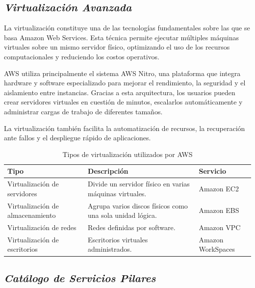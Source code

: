 \documentclass[12pt,a4paper]{article}
\begin{document}
\subsection{{\color{azulnoche}\textbf{\textit{Virtualización Avanzada}}}}

La virtualización constituye una de las tecnologías fundamentales sobre las que se basa Amazon Web Services\parencite{awsNitro}. Esta técnica permite ejecutar múltiples máquinas virtuales sobre un mismo servidor físico, optimizando el uso de los recursos computacionales y reduciendo los costos operativos.

AWS utiliza principalmente el sistema AWS Nitro, una plataforma que integra hardware y software especializado para mejorar el rendimiento, la seguridad y el aislamiento entre instancias. Gracias a esta arquitectura, los usuarios pueden crear servidores virtuales en cuestión de minutos, escalarlos automáticamente y administrar cargas de trabajo de diferentes tamaños\parencite{awsNitro}.

La virtualización también facilita la automatización de recursos, la recuperación ante fallos y el despliegue rápido de aplicaciones.

\begin{table}[H]
\centering
\caption{Tipos de virtualización utilizados por AWS}
\begin{tabularx}{\textwidth}{lXX}
\toprule
\textbf{Tipo} & \textbf{Descripción} & \textbf{Servicio}\\
\midrule
Virtualización de servidores & Divide un servidor físico en varias máquinas virtuales. & Amazon EC2\\

Virtualización de almacenamiento & Agrupa varios discos físicos como una sola unidad lógica. & Amazon EBS\\

Virtualización de redes & Redes definidas por software. & Amazon VPC\\

Virtualización de escritorios & Escritorios virtuales administrados. & Amazon WorkSpaces\\
\bottomrule
\end{tabularx}
\end{table}

\subsection{{\color{azulnoche}\textbf{\textit{Catálogo de Servicios Pilares}}}}
\end{document}
